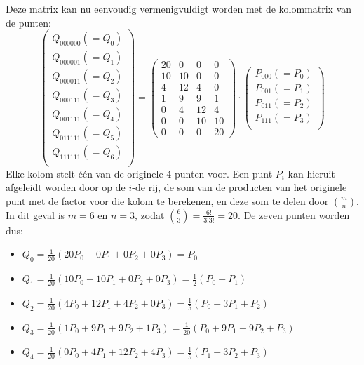 \begin{itemize}
{\begin{itemize}
$$			$$
			Deze matrix kan nu eenvoudig vermenigvuldigt worden met de kolommatrix van de punten:
			$$
			\begin{pmatrix}
				Q_{000000} (=Q_0) \\
				Q_{000001} (=Q_1)\\
				Q_{000011} (=Q_2)\\
				Q_{000111} (=Q_3)\\
				Q_{001111} (=Q_4)\\
				Q_{011111} (=Q_5)\\
				Q_{111111} (=Q_6)\\
			\end{pmatrix}
			= 
			\begin{pmatrix}
				20 & 0  & 0  & 0  \\ 
				10 & 10 & 0  & 0  \\ 
				4  & 12 & 4  & 0  \\ 
				1  & 9  & 9  & 1  \\ 
				0  & 4  & 12 & 4  \\ 
				0  & 0  & 10 & 10 \\ 
				0  & 0  & 0  & 20 
			\end{pmatrix}
			\cdot 
			\begin{pmatrix}
				P_{000} (=P_0)\\
				P_{001} (=P_1)\\
				P_{011} (=P_2)\\
				P_{111} (=P_3)\\
			\end{pmatrix}
			$$
			Elke kolom stelt één van de originele 4 punten voor. Een punt $P_i$ kan hieruit afgeleidt worden door op de $i$-de rij, de som van 
			de producten van het originele punt met de factor voor die kolom te berekenen, en deze som te delen door $\binom{m}{n}$. In dit geval is $m = 6$ en $n = 3$, zodat $\binom{6}{3} = \frac{6!}{3! 3!} = 20$. De zeven punten worden dus:
			\begin{itemize}
				\item $Q_0 = \frac{1}{20} (20P_0 + 0P_1  + 0P_2  + 0P_3) = P_0$
				\item $Q_1 = \frac{1}{20}(10P_0 + 10P_1 + 0P_2  + 0P_3) = \frac{1}{2}(P_0 + P_1)$ 
				\item $Q_2 = \frac{1}{20}(4P_0  + 12P_1 + 4P_2  + 0P_3) = \frac{1}{5}(P_0  + 3P_1 + P_2)$
				\item $Q_3 = \frac{1}{20}(1P_0  + 9P_1 + 9P_2  + 1P_3) = \frac{1}{20}(P_0 + 9P_1  + 9P_2 + P_3)$
				\item $Q_4 = \frac{1}{20}(0P_0  + 4P_1 + 12P_2  + 4P_3) = \frac{1}{5}(P_1  + 3P_2 + P_3)$

\end{itemize}
\end{itemize}}
\end{itemize}
